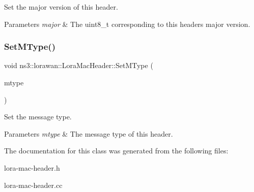 Set the major version of this header.


\begin{DoxyParams}{Parameters}
{\em major} & The uint8\+\_\+t corresponding to this header\textquotesingle{}s major version. \\
\hline
\end{DoxyParams}
\mbox{\label{classns3_1_1lorawan_1_1LoraMacHeader_a5940848a7eee76b4a55fa19b380a5862}} 
\subsubsection{\texorpdfstring{Set\+M\+Type()}{SetMType()}}
{\footnotesize\ttfamily void ns3\+::lorawan\+::\+Lora\+Mac\+Header\+::\+Set\+M\+Type (\begin{DoxyParamCaption}\item[{enum \hyperlink{classns3_1_1lorawan_1_1LoraMacHeader_afd050ac67eab24871452323799e07e94}{M\+Type}}]{mtype }\end{DoxyParamCaption})}

Set the message type.


\begin{DoxyParams}{Parameters}
{\em mtype} & The message type of this header. \\
\hline
\end{DoxyParams}


The documentation for this class was generated from the following files\+:\begin{DoxyCompactItemize}
\item 
lora-\/mac-\/header.\+h\item 
lora-\/mac-\/header.\+cc\end{DoxyCompactItemize}
